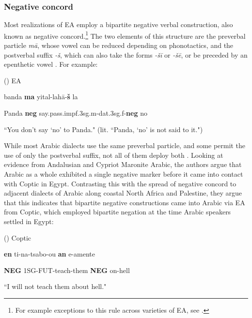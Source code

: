\documentclass[12pt,a4paper]{article}
\newcounter{example}
\begin{document}
\subsubsection{Negative concord}
\label{subsubsec:negative-concord}

Most realizations of EA employ a bipartite negative verbal construction, also known as negative concord.\footnote{For example exceptions to this rule across varieties of EA, see \textcite{soltan_morphosyntactic_2012, lucas_contact_2020}.} The two elements of this structure are the preverbal particle \textit{mā}, whose vowel can be reduced depending on phonotactics, and the postverbal suffix \textit{-š}, which can also take the forms \textit{-šī} or \textit{-šē}, or be preceded by an epenthetic vowel \parencite{lucas_contact_2010}. For example:

\vspace{3mm}
(\theexample) EA \parencite[648]{lucas_contact_2020}

banda \textbf{ma} yit\textglotstop al-lahā-\textbf{š} la\textglotstop

Panda \textbf{neg} say.pass.impf.3sg.m-dat.3sg.f-\textbf{neg} no

``You don’t say `no' to Panda." (lit. ``Panda, `no' is not said to it.")
\vspace{3mm}

While most Arabic dialects use the same preverbal particle, and some permit the use of only the postverbal suffix, not all of them deploy both \parencite{lucas_contact_2020}. Looking at evidence from Andalusian and Cypriot Maronite Arabic, the authors argue that Arabic as a whole exhibited a single negative marker before it came into contact with Coptic in Egypt. Contrasting this with the spread of negative concord to adjacent dialects of Arabic along coastal North Africa and Palestine, they argue that this indicates that bipartite negative constructions came into Arabic via EA from Coptic, which employed bipartite negation at the time Arabic speakers settled in Egypt:

\vspace{3mm}
(\theexample) Coptic \parencite[389]{lucas_contact_2010}

\textbf{en} ti-na-tsabo-ou \textbf{an} e-amente

\textbf{NEG} 1SG-FUT-teach-them \textbf{NEG} on-hell 

``I will not teach them about hell."
\vspace{3mm}
\end{document}
